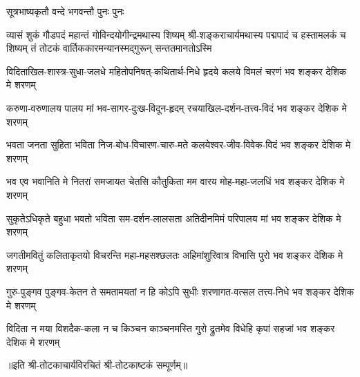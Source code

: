 

%
{सूत्रभाष्यकृतौ वन्दे भगवन्तौ पुनः पुनः}%

%
{व्यासं शुकं गौडपदं महान्तं गोविन्दयोगीन्द्रमथास्य शिष्यम्}%
{श्री-शङ्कराचार्यमथास्य पद्मपादं च हस्तामलकं च शिष्यम्}%
{तं तोटकं वार्तिककारमन्यानस्मद्गुरून् सन्ततमानतोऽस्मि}%

\twolineshloka
{विदिताखिल-शास्त्र-सुधा-जलधे महितोपनिषत्-कथितार्थ-निधे}%
{हृदये कलये विमलं चरणं भव शङ्कर देशिक मे शरणम्}%


\twolineshloka
{करुणा-वरुणालय पालय मां भव-सागर-दुःख-विदून-हृदम्}%
{रचयाखिल-दर्शन-तत्त्व-विदं भव शङ्कर देशिक मे शरणम्}%


\twolineshloka
{भवता जनता सुहिता भविता निज-बोध-विचारण-चारु-मते}%
{कलयेश्वर-जीव-विवेक-विदं भव शङ्कर देशिक मे शरणम्}%


\twolineshloka
{भव एव भवानिति मे नितरां समजायत चेतसि कौतुकिता}%
{मम वारय मोह-महा-जलधिं भव शङ्कर देशिक मे शरणम्}%


\twolineshloka
{सुकृतेऽधिकृते बहुधा भवतो भविता सम-दर्शन-लालसता}%
{अतिदीनमिमं परिपालय मां भव शङ्कर देशिक मे शरणम्}%


\twolineshloka
{जगतीमवितुं कलिताकृतयो विचरन्ति महा-महसश्छलतः}%
{अहिमांशुरिवात्र विभासि पुरो भव शङ्कर देशिक मे शरणम्}%


\twolineshloka
{गुरु-पुङ्गव पुङ्गव-केतन ते समतामयतां न हि कोऽपि सुधीः}%
{शरणागत-वत्सल तत्त्व-निधे भव शङ्कर देशिक मे शरणम्}%


\twolineshloka
{विदिता न मया विशदैक-कला न च किञ्चन काञ्चनमस्ति गुरो}%
{द्रुतमेव विधेहि कृपां सहजां भव शङ्कर देशिक मे शरणम्}%


॥इति श्री-तोटकाचार्यविरचितं श्री-तोटकाष्टकं सम्पूर्णम्॥